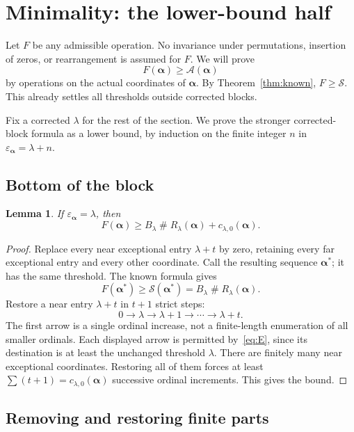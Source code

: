 \documentclass[11pt,letterpaper]{article}
\newtheorem{lemma}[theorem]{Lemma}
\theoremstyle{definition}
\theoremstyle{remark}
\newcommand{\Sop}{\mathcal S}
\newcommand{\Aop}{\mathcal A}
\newcommand{\seq}[1]{\boldsymbol{#1}}
\newcommand{\ns}{\mathbin{\#}}
\newcommand{\epsa}{\varepsilon_{\seq\alpha}}
\begin{document}
\section{Minimality: the lower-bound half}\label{sec:lower}

Let $F$ be any admissible operation. No invariance under permutations, insertion of zeros, or rearrangement is assumed for $F$. We will prove
\[
 F(\seq\alpha)\ge\Aop(\seq\alpha)
\]
by operations on the actual coordinates of $\seq\alpha$. By Theorem~\ref{thm:known}, $F\ge\Sop$. This already settles all thresholds outside corrected blocks.

Fix a corrected $\lambda$ for the rest of the section. We prove the stronger corrected-block formula as a lower bound, by induction on the finite integer $n$ in $\epsa=\lambda+n$.

\subsection{Bottom of the block}

\begin{lemma}\label{lem:lower-bottom}
If $\epsa=\lambda$, then
\[
 F(\seq\alpha)\ge B_\lambda\ns R_\lambda(\seq\alpha)
                         +c_{\lambda,0}(\seq\alpha).
\]
\end{lemma}
\begin{proof}
Replace every near exceptional entry $\lambda+t$ by zero, retaining every far exceptional entry and every other coordinate. Call the resulting sequence $\seq\alpha^*$; it has the same threshold. The known formula gives
\[
 F(\seq\alpha^*)\ge\Sop(\seq\alpha^*)
           =B_\lambda\ns R_\lambda(\seq\alpha).
\]
Restore a near entry $\lambda+t$ in $t+1$ strict steps:
\[
 0\longrightarrow\lambda\longrightarrow\lambda+1
   \longrightarrow\cdots\longrightarrow\lambda+t.
\]
The first arrow is a single ordinal increase, not a finite-length enumeration of all smaller ordinals. Each displayed arrow is permitted by~\eqref{eq:E}, since its destination is at least the unchanged threshold $\lambda$. There are finitely many near exceptional coordinates. Restoring all of them forces at least
$\sum(t+1)=c_{\lambda,0}(\seq\alpha)$ successive ordinal increments. This gives the bound.
\end{proof}

\subsection{Removing and restoring finite parts}
\end{document}
